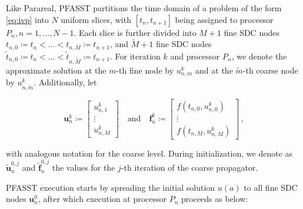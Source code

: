 Like Parareal, PFASST partitions the time domain of a problem of the form \ref{eq:ivp} into \(N\) uniform slices, with \([t_n, t_{n+1}]\) being assigned to processor \(P_n, n = 1,\dots,N-1\). Each slice is further divided into \(M+1\) fine SDC nodes \(t_{n,0} \coloneqq t_n < \dots < t_{n,M} \coloneqq t_{n+1}\), and \(\tilde{M}+1\) fine SDC nodes \(\tilde{t}_{n,0} \coloneqq t_n < \dots < \tilde{t}_{n,\tilde{M}} \coloneqq t_{n+1}\). For iteration \(k\) and processor \(P_n\), we denote the approximate solution at the \(m\)-th fine node by \(u^k_{n,m}\) and at the \(\tilde{m}\)-th coarse node by  \(u^k_{n,\tilde{m}}\). Additionally, let

\begin{equation}
    \bm{u}^k_n \coloneqq 
    \begin{bmatrix}
        u^k_{n,1} \\ \vdots \\ u^k_{n,M} %
    \end{bmatrix}
    \quad \text{and} \quad
    \bm{f}^k_n \coloneqq
    \begin{bmatrix}
        f(t_{n,0}, u^k_{n,0}) \\ \vdots \\ f(t_{n,M}, u^k_{n,M})
    \end{bmatrix}\,,
\end{equation}

with analogous notation for the coarse level. During initialization, we denote as \(\bm{\tilde{u}}^{0,j}_n\) and \(\bm{\tilde{f}}^{0,j}_n\) the values for the \(j\)-th iteration of the coarse propagator.

PFASST execution starts by spreading the initial solution \(u(a)\) to all fine SDC nodes \(\bm{u}^0_n\), after which execution at processor \(P_n\) proceeds as below:

